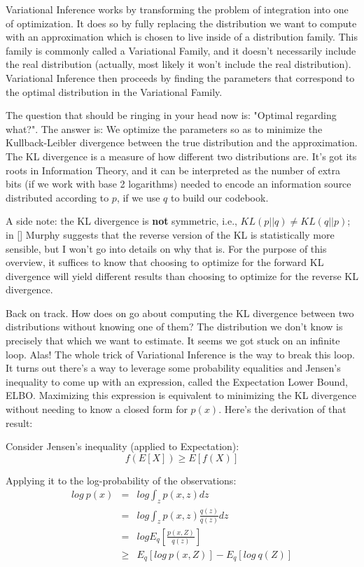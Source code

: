 \documentclass[11pt]{article}
\begin{document}
Variational Inference works by transforming the problem of integration
into one of optimization. It does so by fully replacing the distribution
we want to compute with an approximation which is chosen to live inside
of a distribution family. This family is commonly called a Variational
Family, and it doesn't necessarily include the real distribution
(actually, most likely it won't include the real distribution).
Variational Inference then proceeds by finding the parameters that
correspond to the optimal distribution in the Variational Family.
	
The question that should be ringing in your head now is: "Optimal
regarding what?". The answer is: We optimize the parameters so as to
minimize the Kullback-Leibler divergence between the true distribution
and the approximation. The KL divergence is a measure of how different
two distributions are. It's got its roots in Information Theory, and it
can be interpreted as the number of extra bits (if we work with base 2
logarithms) needed to encode an information source distributed according
to \(p\), if we use \(q\) to build our codebook.
	
A side note: the KL divergence is \textbf{not} symmetric, i.e.,
\(KL(p||q) \neq KL(q||p)\); in {[}{]} Murphy suggests that the reverse
version of the KL is statistically more sensible, but I won't go into
details on why that is. For the purpose of this overview, it suffices to
know that choosing to optimize for the forward KL divergence will yield
different results than choosing to optimize for the reverse KL
divergence.
	
Back on track. How does on go about computing the KL divergence between
two distributions without knowing one of them? The distribution we don't
know is precisely that which we want to estimate. It seems we got stuck
on an infinite loop. Alas! The whole trick of Variational Inference is
the way to break this loop. It turns out there's a way to leverage some
probability equalities and Jensen's inequality to come up with an
expression, called the Expectation Lower Bound, ELBO. Maximizing this
expression is equivalent to minimizing the KL divergence without needing
to know a closed form for \(p(x)\). Here's the derivation of that
result:
	
Consider Jensen's inequality (applied to Expectation):
\[f(E[X]) \geq E[f(X)]\]
	
Applying it to the log-probability of the observations:
\begin{eqnarray}
	log\ p(x) &=& log \int_z p(x,z) dz \nonumber \\
	&=& log \int_z p(x,z)\frac{q(z)}{q(z)} dz \nonumber \\
	&=& log E_q[\frac{p(x,Z)}{q(z)}] \nonumber \\
	&\geq& E_q[log\ p(x,Z)] - E_q[log\ q(Z)] \nonumber 
\end{eqnarray}
	
\end{document}
